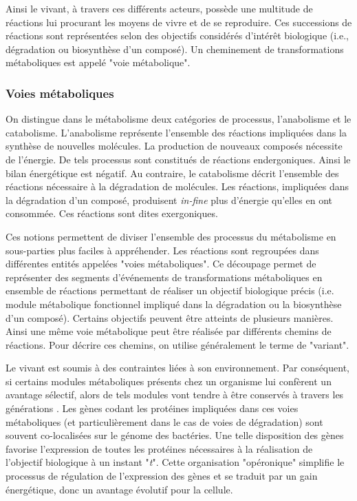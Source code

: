\begin{refsegment}
    Ainsi le vivant, à travers ces différents acteurs, possède une multitude de réactions lui procurant les moyens de vivre et de se reproduire. Ces successions de réactions sont représentées selon des objectifs considérés d'intérêt biologique (i.e., dégradation ou biosynthèse d’un composé). Un cheminement de transformations métaboliques est appelé "voie métabolique".
    
    
    \subsubsection{Voies métaboliques}
    On distingue dans le métabolisme deux catégories de processus, l'anabolisme et le catabolisme. L'anabolisme représente l'ensemble des réactions impliquées dans la synthèse de nouvelles molécules. La production de nouveaux composés nécessite de l'énergie. De tels processus sont constitués de réactions endergoniques. Ainsi le bilan énergétique est négatif.  Au contraire, le catabolisme décrit l'ensemble des réactions nécessaire à la dégradation de molécules. Les réactions, impliquées dans la dégradation d'un composé,  produisent \textit{in-fine} plus d'énergie qu'elles en ont consommée. Ces réactions sont dites exergoniques.
    
    Ces notions permettent de diviser l'ensemble des processus du métabolisme en sous-parties plus faciles à appréhender. Les réactions sont regroupées dans différentes entités appelées "voies métaboliques". Ce découpage permet de représenter des segments d'événements de transformations métaboliques en ensemble de réactions permettant de réaliser un objectif biologique précis (i.e. module métabolique fonctionnel impliqué dans la dégradation ou la biosynthèse d’un composé). Certains objectifs peuvent être atteints de plusieurs manières. Ainsi une même voie métabolique peut être réalisée par différents chemins de réactions. Pour décrire ces chemins,  on utilise généralement le terme de "variant".
    
    Le vivant est soumis à des contraintes liées à son environnement. Par conséquent, si certains modules métaboliques présents chez un organisme lui confèrent un avantage sélectif, alors de tels modules vont tendre à être conservés à travers les générations \cite{braakman2012compositional}. Les gènes codant les protéines impliquées dans ces voies métaboliques (et particulièrement dans le cas de voies de dégradation) sont souvent co-localisées sur le génome des bactéries. Une telle disposition des gènes favorise l’expression de toutes les protéines nécessaires à la réalisation de l’objectif biologique à un instant  "\textit{t}". Cette organisation "opéronique" simplifie le processus de régulation de l'expression des gènes et se traduit par un gain énergétique, donc un avantage évolutif pour la cellule. 
    

\end{refsegment}
